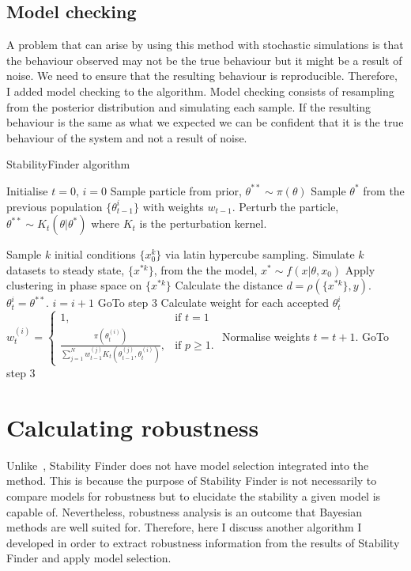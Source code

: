 \subsection{Model checking}
\label{sec:mod_check}
A problem that can arise by using this method with stochastic simulations is that the behaviour observed may not be the true behaviour but it might be a result of noise. We need to ensure that the resulting behaviour is reproducible. Therefore, I added model checking to the algorithm. Model checking consists of resampling from the posterior distribution and simulating each sample. If the resulting behaviour is the same as what we expected we can be confident that it is the true behaviour of the system and not a result of noise. 
\begin{algorithm}[htbp]
\label{alg:StabilityFinder}
\caption{ StabilityFinder algorithm}
 \begin{algorithmic}[1]
    \Statex
	\State Initialise $t=0$, 
	\State $i=0$ 
		\State Sample particle from prior, $\theta^{**} \sim \pi(\theta)$
	\Else
		\State Sample $\theta^*$ from the previous population $\{ \theta_{t-1}^{i} \}$ with weights $w_{t-1}$.
		\State Perturb the particle, $\theta^{**} \sim K_t(\theta|\theta^{*})$ where $K_t$ is the perturbation kernel.
	\EndIf
	
	\State Sample $k$ initial conditions $\{ x_0^k \}$ via latin hypercube sampling.
	\State Simulate $k$ datasets to steady state, $\{ x^{*k} \}$, from the the model, $ x^{*} \sim f(x|\theta, x_0)$
    	\State Apply clustering in phase space on $\{ x^{*k} \}$
    	\State Calculate the distance $ d = \rho( \{ x^{*k} \},y)$. 
	\State $\theta^{i}_{t} = \theta^{**}$.  $i = i + 1$
		GoTo step 3
	\Else
	\State Calculate weight for each accepted $\theta^{i}_t$
	\State $w_{t}^{(i)} = \begin{cases} 1, & \mbox{if } t = 1 \\\frac{\pi(\theta_{t}^{(i)})}{\sum_{j=1}^N w_{t-1}^{(j)} K_{t}(\theta_{t-1}^{(j)}, \theta_{t}^{(i)})}, & \mbox{if } p \geq  1. \end{cases}$
	\State Normalise weights
	\State $t = t + 1$. 
	\State GoTo step 3 
	\EndIf
	\EndIf
	\EndIf	
\end{algorithmic} 
\end{algorithm}

\clearpage

\section{Calculating robustness}
\label{sec:cal_rob}
Unlike~\textcite{Toni:2009tr}, Stability Finder does not have model selection integrated into the method. This is because the purpose of Stability Finder is not necessarily to compare models for robustness but to elucidate the stability a given model is capable of. Nevertheless, robustness analysis is an outcome that Bayesian methods are well suited for. Therefore, here I discuss another algorithm I developed in order to extract robustness information from the results of Stability Finder and apply model selection.  

